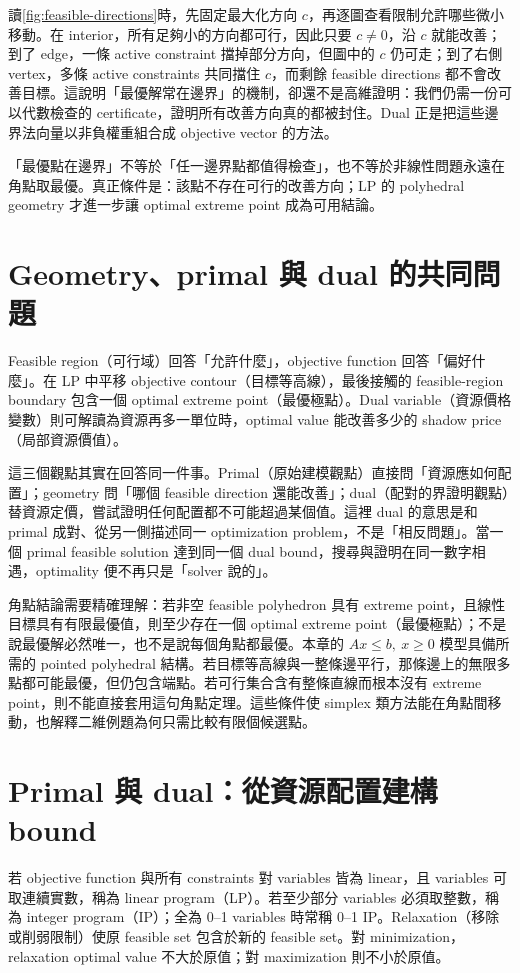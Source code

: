 \documentclass[11pt,a4paper,oneside,openany]{book}
\begin{document}
讀\cref{fig:feasible-directions}時，先固定最大化方向 $c$，再逐圖查看限制允許哪些微小移動。在 interior，所有足夠小的方向都可行，因此只要 $c\ne0$，沿 $c$ 就能改善；到了 edge，一條 active constraint 擋掉部分方向，但圖中的 $c$ 仍可走；到了右側 vertex，多條 active constraints 共同擋住 $c$，而剩餘 feasible directions 都不會改善目標。這說明「最優解常在邊界」的機制，卻還不是高維證明：我們仍需一份可以代數檢查的 certificate，證明所有改善方向真的都被封住。Dual 正是把這些邊界法向量以非負權重組合成 objective vector 的方法。

\begin{misconception}
「最優點在邊界」不等於「任一邊界點都值得檢查」，也不等於非線性問題永遠在角點取最優。真正條件是：該點不存在可行的改善方向；LP 的 polyhedral geometry 才進一步讓 optimal extreme point 成為可用結論。
\end{misconception}

\section{Geometry、primal 與 dual 的共同問題}
\begin{coreintuition}
Feasible region（可行域）回答「允許什麼」，objective function 回答「偏好什麼」。在 LP 中平移 objective contour（目標等高線），最後接觸的 feasible-region boundary 包含一個 optimal extreme point（最優極點）。Dual variable（資源價格變數）則可解讀為資源再多一單位時，optimal value 能改善多少的 shadow price（局部資源價值）。
\end{coreintuition}

這三個觀點其實在回答同一件事。Primal（原始建模觀點）直接問「資源應如何配置」；geometry 問「哪個 feasible direction 還能改善」；dual（配對的界證明觀點）替資源定價，嘗試證明任何配置都不可能超過某個值。這裡 dual 的意思是和 primal 成對、從另一側描述同一 optimization problem，不是「相反問題」。當一個 primal feasible solution 達到同一個 dual bound，搜尋與證明在同一數字相遇，optimality 便不再只是「solver 說的」。

角點結論需要精確理解：若非空 feasible polyhedron 具有 extreme point，且線性目標具有有限最優值，則至少存在一個 optimal extreme point（最優極點）；不是說最優解必然唯一，也不是說每個角點都最優。本章的 $Ax\le b,\ x\ge0$ 模型具備所需的 pointed polyhedral 結構。若目標等高線與一整條邊平行，那條邊上的無限多點都可能最優，但仍包含端點。若可行集合含有整條直線而根本沒有 extreme point，則不能直接套用這句角點定理。這些條件使 simplex 類方法能在角點間移動，也解釋二維例題為何只需比較有限個候選點。

\section{Primal 與 dual：從資源配置建構 bound}
\begin{definition}[LP、IP 與 relaxation]
若 objective function 與所有 constraints 對 variables 皆為 linear，且 variables 可取連續實數，稱為 linear program（LP）。若至少部分 variables 必須取整數，稱為 integer program（IP）；全為 0--1 variables 時常稱 0--1 IP。Relaxation（移除或削弱限制）使原 feasible set 包含於新的 feasible set。對 minimization，relaxation optimal value 不大於原值；對 maximization 則不小於原值。
\end{definition}
\end{document}
